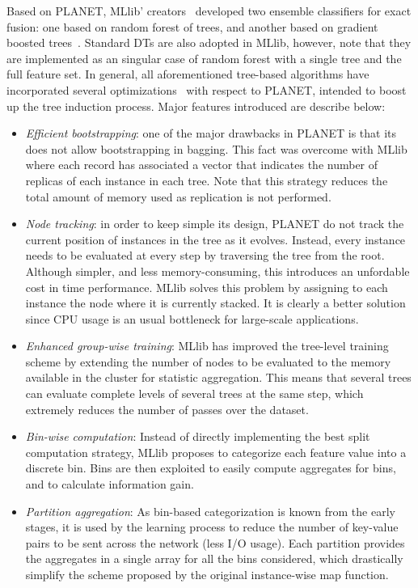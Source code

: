 \documentclass[3p,review]{elsarticle}
\begin{document}
Based on PLANET, MLlib' creators~\cite{mllib15} developed two ensemble classifiers for exact fusion: one based on random forest of trees, and another based on gradient boosted trees~\cite{mllibtrees}. Standard DTs are also adopted in MLlib, however, note that they are implemented as an singular case of random forest with a single tree and the full feature set. In general, all aforementioned tree-based algorithms have incorporated several optimizations~\cite{mllibdt} with respect to PLANET, intended to boost up the tree induction process. Major features introduced are describe below:

\begin{itemize}
	\item \textit{Efficient bootstrapping}: one of the major drawbacks in PLANET is that its does not allow bootstrapping in bagging. This fact was overcome with MLlib where each record has associated a vector that indicates the number of replicas of each instance in each tree. Note that this strategy reduces the total amount of memory used as replication is not performed.
	\item \textit{Node tracking}: in order to keep simple its design, PLANET do not track the current position of instances in the tree as it evolves. Instead, every instance needs to be evaluated at every step by traversing the tree from the root. Although simpler, and less memory-consuming, this introduces an unfordable cost in time performance. MLlib solves this problem by assigning to each instance the node where it is currently stacked. It is clearly a better solution since CPU usage is an usual bottleneck for large-scale applications.
	\item \textit{Enhanced group-wise training}: MLlib has improved the tree-level training scheme by extending the number of nodes to be evaluated to the memory available in the cluster for statistic aggregation. This means that several trees can evaluate complete levels of several trees at the same step, which extremely reduces the number of passes over the dataset.
	\item \textit{Bin-wise computation}: Instead of directly implementing the best split computation strategy, MLlib proposes to categorize each feature value into a discrete bin. Bins are then exploited to easily compute aggregates for bins, and to calculate information gain. 
	 \item \textit{Partition aggregation}: As bin-based categorization is known from the early stages, it is used by the learning process to reduce the number of key-value pairs to be sent across the network (less I/O usage). Each partition provides the aggregates in a single array for all the bins considered, which drastically simplify the scheme proposed by the original instance-wise map function.
\end{itemize}
\end{document}
